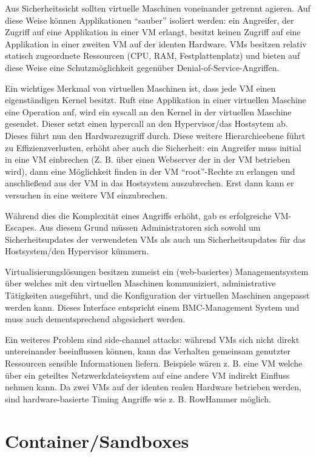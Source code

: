 Aus Sicherheitssicht sollten virtuelle Maschinen voneinander getrennt agieren. Auf diese Weise können Applikationen ``sauber'' isoliert werden: ein Angreifer, der Zugriff auf eine Applikation in einer VM erlangt, besitzt keinen Zugriff auf eine Applikation in einer zweiten VM auf der identen Hardware. VMs besitzen relativ statisch zugeordnete Ressourcen (CPU, RAM, Festplattenplatz) und bieten auf diese Weise eine Schutzmöglichkeit gegenüber Denial-of-Service-Angriffen.

Ein wichtiges Merkmal von virtuellen Maschinen ist, dass jede VM einen eigenständigen Kernel besitzt. Ruft eine Applikation in einer virtuellen Maschine eine Operation auf, wird ein syscall an den Kernel in der virtuellen Maschine gesendet. Dieser setzt einen hypercall an den Hypervisor/das Hostsytem ab. Dieses führt nun den Hardwarezugriff durch. Diese weitere Hierarchieebene führt zu Effizienzverlusten, erhöht aber auch die Sicherheit: ein Angreifer muss initial in eine VM einbrechen (Z. B. über einen Webserver der in der VM betrieben wird), dann eine Möglichkeit finden in der VM ``root''-Rechte zu erlangen und anschließend aus der VM in das Hostsystem auszubrechen. Erst dann kann er versuchen in eine weitere VM einzubrechen.

Während dies die Komplexität eines Angriffs erhöht, gab es erfolgreiche VM-Escapes. Aus diesem Grund müssen Administratoren sich sowohl um Sicherheitsupdates der verwendeten VMs als auch um Sicherheitsupdates für das Hostsystem/den Hypervisor kümmern.

Virtualisierungslösungen besitzen zumeist ein (web-basiertes) Managementsystem über welches mit den virtuellen Maschinen kommuniziert, administrative Tätigkeiten ausgeführt, und die Konfiguration der virtuellen Maschinen angepasst werden kann. Dieses Interface entspricht einem BMC-Management System und muss auch dementsprechend abgesichert werden.

Ein weiteres Problem sind side-channel attacks: während VMs sich nicht direkt untereinander beeinflussen können, kann das Verhalten gemeinsam genutzter Ressourcen sensible Informationen liefern. Beispiele wären z. B. eine VM welche über ein geteiltes Netzwerkdateisystem auf eine andere VM indirekt Einfluss nehmen kann. Da zwei VMs auf der identen realen Hardware betrieben werden, sind hardware-basierte Timing Angriffe wie z. B. RowHammer möglich.

\chapter{Container/Sandboxes}

